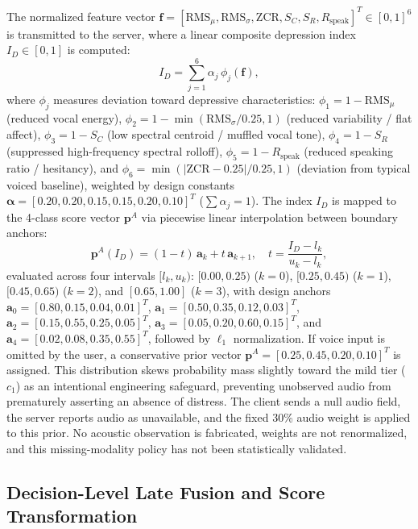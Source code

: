 \documentclass[10pt, conference, letterpaper]{IEEEtran}
\begin{document}
The normalized feature vector
$\mathbf{f} = [\text{RMS}_\mu, \text{RMS}_\sigma, \text{ZCR}, S_C, S_R, R_{\text{speak}}]^T \in [0,1]^6$
is transmitted to the server, where a linear composite depression index
$I_D \in [0,1]$ is computed:
\begin{equation}
  I_D = \sum_{j=1}^6 \alpha_j \, \phi_j(\mathbf{f}),
  \label{eq:acoustic_index}
\end{equation}
where $\phi_j$ measures deviation toward depressive characteristics:
$\phi_1 = 1 - \text{RMS}_\mu$ (reduced vocal energy),
$\phi_2 = 1 - \min(\text{RMS}_\sigma/0.25, 1)$ (reduced variability / flat affect),
$\phi_3 = 1 - S_C$ (low spectral centroid / muffled vocal tone),
$\phi_4 = 1 - S_R$ (suppressed high-frequency spectral rolloff),
$\phi_5 = 1 - R_{\text{speak}}$ (reduced speaking ratio / hesitancy), and
$\phi_6 = \min(|\text{ZCR} - 0.25|/0.25, 1)$ (deviation from typical voiced baseline),
weighted by design constants
$\boldsymbol{\alpha} = [0.20, 0.20, 0.15, 0.15, 0.20, 0.10]^T$ ($\sum \alpha_j = 1$).
The index $I_D$ is mapped to the 4-class score vector $\mathbf{p}^A$ via
piecewise linear interpolation between boundary anchors:
\begin{equation}
  \mathbf{p}^A(I_D) = (1-t)\,\mathbf{a}_k + t\,\mathbf{a}_{k+1}, \quad t = \frac{I_D - l_k}{u_k - l_k},
  \label{eq:audio_interp}
\end{equation}
evaluated across four intervals $[l_k, u_k)$: $[0.00, 0.25)$ ($k=0$),
$[0.25, 0.45)$ ($k=1$), $[0.45, 0.65)$ ($k=2$), and $[0.65, 1.00]$ ($k=3$),
with design anchors $\mathbf{a}_0 = [0.80, 0.15, 0.04, 0.01]^T$,
$\mathbf{a}_1 = [0.50, 0.35, 0.12, 0.03]^T$,
$\mathbf{a}_2 = [0.15, 0.55, 0.25, 0.05]^T$,
$\mathbf{a}_3 = [0.05, 0.20, 0.60, 0.15]^T$, and
$\mathbf{a}_4 = [0.02, 0.08, 0.35, 0.55]^T$, followed by $\ell_1$ normalization.
If voice input is omitted by the user, a conservative prior vector
$\mathbf{p}^A = [0.25, 0.45, 0.20, 0.10]^T$ is assigned.
This distribution skews probability mass slightly toward the mild tier ($c_1$)
as an intentional engineering safeguard, preventing unobserved audio from
prematurely asserting an absence of distress. The client sends a null audio
field, the server reports audio as unavailable, and the fixed 30\% audio weight
is applied to this prior. No acoustic observation is fabricated, weights are
not renormalized, and this missing-modality policy has not been statistically validated.

\subsection{Decision-Level Late Fusion and Score Transformation}
\label{sec:fusion}
\end{document}
